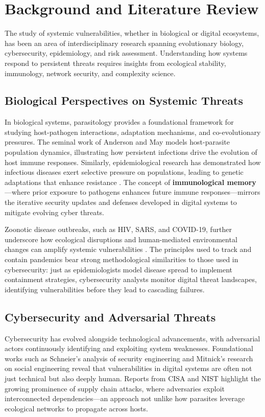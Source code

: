 \documentclass{article}
\begin{document}
\section{Background and Literature Review}
The study of systemic vulnerabilities, whether in biological or digital ecosystems, has been an area of interdisciplinary research spanning evolutionary biology, cybersecurity, epidemiology, and risk assessment. Understanding how systems respond to persistent threats requires insights from ecological stability, immunology, network security, and complexity science.

\subsection{Biological Perspectives on Systemic Threats}
In biological systems, parasitology provides a foundational framework for studying host-pathogen interactions, adaptation mechanisms, and co-evolutionary pressures. The seminal work of Anderson and May \citep{anderson1991infectious} models host-parasite population dynamics, illustrating how persistent infections drive the evolution of host immune responses. Similarly, epidemiological research has demonstrated how infectious diseases exert selective pressure on populations, leading to genetic adaptations that enhance resistance \citep{dobson1989population}. The concept of \textbf{immunological memory}—where prior exposure to pathogens enhances future immune responses—mirrors the iterative security updates and defenses developed in digital systems to mitigate evolving cyber threats.

Zoonotic disease outbreaks, such as HIV, SARS, and COVID-19, further underscore how ecological disruptions and human-mediated environmental changes can amplify systemic vulnerabilities \citep{morens2020emerging}. The principles used to track and contain pandemics bear strong methodological similarities to those used in cybersecurity: just as epidemiologists model disease spread to implement containment strategies, cybersecurity analysts monitor digital threat landscapes, identifying vulnerabilities before they lead to cascading failures.

\subsection{Cybersecurity and Adversarial Threats}
Cybersecurity has evolved alongside technological advancements, with adversarial actors continuously identifying and exploiting system weaknesses. Foundational works such as Schneier’s analysis of security engineering \citep{schneier2000secrets} and Mitnick’s research on social engineering \citep{mitnick2003art} reveal that vulnerabilities in digital systems are often not just technical but also deeply human. Reports from CISA and NIST \citep{cisa2022supply} highlight the growing prominence of supply chain attacks, where adversaries exploit interconnected dependencies—an approach not unlike how parasites leverage ecological networks to propagate across hosts.
\end{document}

